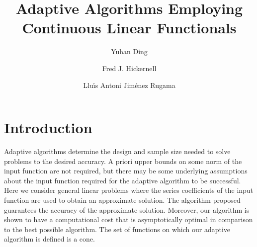 \documentclass[final]{elsarticle}
\theoremstyle{definition}
\theoremstyle{remark}
\begin{document}
\begin{frontmatter}

\title{Adaptive Algorithms Employing Continuous Linear Functionals}
\author{Yuhan Ding}
\address{MCA 310, Department of Mathematics, Misericordia University,\\ 301 Lake St., Dallas, PA, 18612}
\author{Fred J. Hickernell}
\address{Center for Interdisciplinary Scientific Computation and \\
Department of Applied Mathematics, Illinois Institute of Technology \\ RE 208, 10 W.\ 32$^{\text{nd}}$ St., Chicago, IL 60616}
\author{Llu\'{\i}s Antoni Jim\'{e}nez Rugama}
\address{Department of Applied Mathematics, Illinois Institute of Technology,\\ RE 208, 10 W.\ 32$^{\text{nd}}$ St., Chicago, IL 60616}
\begin{abstract}
\end{abstract}

\begin{keyword}


\end{keyword}
\end{frontmatter}

\section{Introduction}
Adaptive algorithms determine the design and sample size needed to solve problems to the desired accuracy.  A priori upper bounds on some norm of the input function are not required, but there may be some underlying assumptions about the input function required for the adaptive algorithm to be successful.  Here we consider general linear problems where the series coefficients of the input function are used to obtain an approximate solution.  The algorithm proposed guarantees the accuracy of the approximate solution.  Moreover, our algorithm is shown to have a computational cost that is asymptotically optimal in comparison to the best possible algorithm.  The set of functions on which our adaptive algorithm is defined is a cone.
\end{document}
